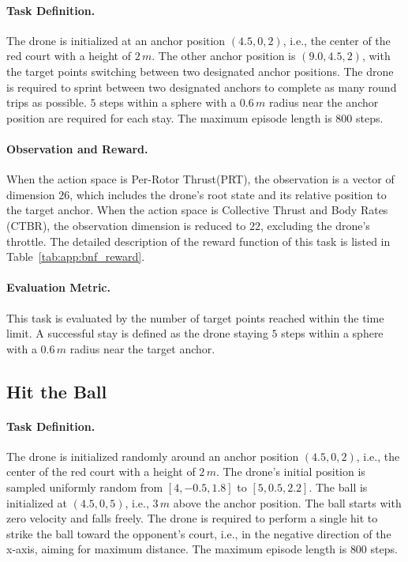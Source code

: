 \paragraph{Task Definition.}
The drone is initialized at an anchor position $(4.5, 0, 2)$, i.e., the center of the red court with a height of $2\,m$. The other anchor position is $(9.0, 4.5, 2)$, with the target points switching between two designated anchor positions. The drone is required to sprint between two designated anchors to complete as many round trips as possible. $5$ steps within a sphere with a $0.6\,m$ radius near the anchor position are required for each stay. The maximum episode length is $800$ steps.
\paragraph{Observation and Reward.}
When the action space is Per-Rotor Thrust(PRT), the observation is a vector of dimension $26$, which includes the drone's root state and its relative position to the target anchor. When the action space is Collective Thrust and Body Rates (CTBR), the observation dimension is reduced to $22$, excluding the drone’s throttle. The detailed description of the reward function of this task is listed in Table~\ref{tab:app:bnf_reward}.
\paragraph{Evaluation Metric.}
This task is evaluated by the number of target points reached within the time limit. A successful stay is defined as the drone staying $5$ steps within a sphere with a $0.6\,m$ radius near the target anchor.


\subsection{Hit the Ball}

\paragraph{Task Definition.}
The drone is initialized randomly around an anchor position $(4.5, 0, 2)$, i.e., the center of the red court with a height of $2\,m$. The drone's initial position is sampled uniformly random from $[4, -0.5, 1.8]$ to $[5, 0.5, 2.2]$. The ball is initialized at $(4.5, 0, 5)$, i.e., $3\,m$ above the anchor position. The ball starts with zero velocity and falls freely. The drone is required to perform a single hit to strike the ball toward the opponent’s court, i.e., in the negative direction of the x-axis, aiming for maximum distance. The maximum episode length is $800$ steps.

